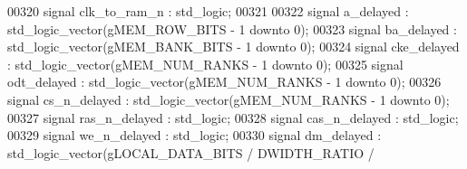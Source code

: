 \begin{DoxyCode}
00320     \textcolor{keywordflow}{signal} \textcolor{vhdlchar}{clk_to_ram_n}    \textcolor{vhdlchar}{:} \textcolor{comment}{std\_logic};
00321 
00322     \textcolor{keywordflow}{signal} \textcolor{vhdlchar}{a_delayed}       \textcolor{vhdlchar}{:} \textcolor{comment}{std\_logic\_vector}\textcolor{vhdlchar}{(}\textcolor{vhdlchar}{gMEM_ROW_BITS} \textcolor{vhdlchar}{-} \textcolor{vhdllogic}{}\textcolor{vhdllogic}{1} \textcolor{keywordflow}{downto} \textcolor{vhdllogic}{}\textcolor{vhdllogic}{0}\textcolor{vhdlchar}{)};
00323     \textcolor{keywordflow}{signal} \textcolor{vhdlchar}{ba_delayed}      \textcolor{vhdlchar}{:} \textcolor{comment}{std\_logic\_vector}\textcolor{vhdlchar}{(}\textcolor{vhdlchar}{gMEM_BANK_BITS} \textcolor{vhdlchar}{-} \textcolor{vhdllogic}{}\textcolor{vhdllogic}{1} \textcolor{keywordflow}{downto} \textcolor{vhdllogic}{}\textcolor{vhdllogic}{0}\textcolor{vhdlchar}{)};
00324     \textcolor{keywordflow}{signal} \textcolor{vhdlchar}{cke_delayed}     \textcolor{vhdlchar}{:} \textcolor{comment}{std\_logic\_vector}\textcolor{vhdlchar}{(}\textcolor{vhdlchar}{gMEM_NUM_RANKS} \textcolor{vhdlchar}{-} \textcolor{vhdllogic}{}\textcolor{vhdllogic}{1} \textcolor{keywordflow}{downto} \textcolor{vhdllogic}{}\textcolor{vhdllogic}{0}\textcolor{vhdlchar}{)};
00325     \textcolor{keywordflow}{signal} \textcolor{vhdlchar}{odt_delayed}     \textcolor{vhdlchar}{:} \textcolor{comment}{std\_logic\_vector}\textcolor{vhdlchar}{(}\textcolor{vhdlchar}{gMEM_NUM_RANKS} \textcolor{vhdlchar}{-} \textcolor{vhdllogic}{}\textcolor{vhdllogic}{1} \textcolor{keywordflow}{downto} \textcolor{vhdllogic}{}\textcolor{vhdllogic}{0}\textcolor{vhdlchar}{)};
00326     \textcolor{keywordflow}{signal} \textcolor{vhdlchar}{cs_n_delayed}    \textcolor{vhdlchar}{:} \textcolor{comment}{std\_logic\_vector}\textcolor{vhdlchar}{(}\textcolor{vhdlchar}{gMEM_NUM_RANKS} \textcolor{vhdlchar}{-} \textcolor{vhdllogic}{}\textcolor{vhdllogic}{1} \textcolor{keywordflow}{downto} \textcolor{vhdllogic}{}\textcolor{vhdllogic}{0}\textcolor{vhdlchar}{)};
00327     \textcolor{keywordflow}{signal} \textcolor{vhdlchar}{ras_n_delayed}   \textcolor{vhdlchar}{:} \textcolor{comment}{std\_logic};
00328     \textcolor{keywordflow}{signal} \textcolor{vhdlchar}{cas_n_delayed}   \textcolor{vhdlchar}{:} \textcolor{comment}{std\_logic};
00329     \textcolor{keywordflow}{signal} \textcolor{vhdlchar}{we_n_delayed}    \textcolor{vhdlchar}{:} \textcolor{comment}{std\_logic};
00330     \textcolor{keywordflow}{signal} \textcolor{vhdlchar}{dm_delayed}      \textcolor{vhdlchar}{:} \textcolor{comment}{std\_logic\_vector}\textcolor{vhdlchar}{(}\textcolor{vhdlchar}{gLOCAL_DATA_BITS} \textcolor{vhdlchar}{/} \textcolor{vhdlchar}{DWIDTH_RATIO} \textcolor{vhdlchar}{/} \textcolor{vhdlchar}{
}
\end{DoxyCode}
